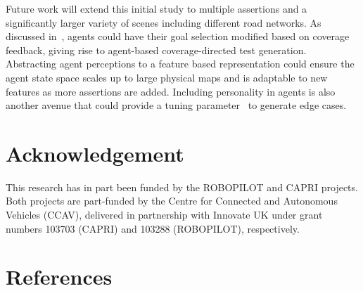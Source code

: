 \documentclass[letterpaper, 10 pt, journal, twoside]{IEEEtran}
\begin{document}
Future work will extend this initial study to multiple assertions and a significantly larger variety of scenes including different road networks. 
As discussed in~\cite{Eder2007}, agents could have their goal selection modified based on coverage feedback, giving rise to  agent-based coverage-directed test generation. 
%
%
Abstracting agent perceptions to a feature based representation could ensure the agent state space scales up to large physical maps and is adaptable to new features as more assertions are added.
Including personality in agents is also another avenue that could provide a tuning parameter~\cite{Zoumpoulaki2010} to generate edge cases. 







\section*{Acknowledgement}
This research has in part been funded by the ROBOPILOT and CAPRI projects. Both
projects are part-funded by the Centre for Connected and Autonomous
Vehicles (CCAV), delivered in partnership with Innovate UK under grant numbers
103703 (CAPRI) and 103288 (ROBOPILOT), respectively.


\balance
\section*{References}
\printbibliography[heading=none]
\end{document}
